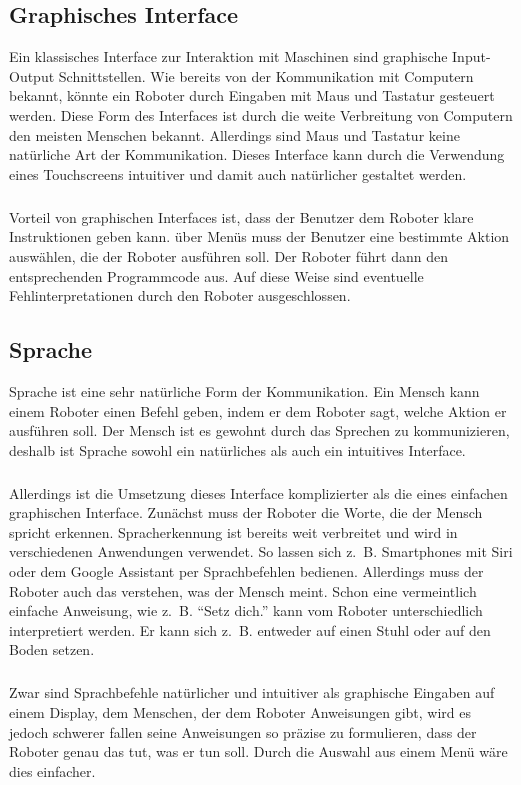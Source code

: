 \subsection{Graphisches Interface}
Ein klassisches Interface zur Interaktion mit Maschinen sind graphische
Input-Output Schnittstellen. Wie bereits von der Kommunikation mit Computern
bekannt, könnte ein Roboter durch Eingaben mit Maus und Tastatur gesteuert
werden. Diese Form des Interfaces ist durch die weite Verbreitung von Computern
den meisten Menschen bekannt. Allerdings sind Maus und Tastatur keine
natürliche Art der Kommunikation. Dieses Interface kann durch die Verwendung
eines Touchscreens intuitiver und damit auch natürlicher gestaltet werden.

\subparagraph{}
Vorteil von graphischen Interfaces ist, dass der Benutzer dem Roboter klare
Instruktionen geben kann. über Menüs muss der Benutzer eine bestimmte Aktion
auswählen, die der Roboter ausführen soll. Der Roboter führt dann den
entsprechenden Programmcode aus. Auf diese Weise sind eventuelle
Fehlinterpretationen durch den Roboter ausgeschlossen.

\subsection{Sprache}
Sprache ist eine sehr natürliche Form der Kommunikation. Ein Mensch kann einem
Roboter einen Befehl geben, indem er dem Roboter sagt, welche Aktion er
ausführen soll. Der Mensch ist es gewohnt durch das Sprechen zu kommunizieren,
deshalb ist Sprache sowohl ein natürliches als auch ein intuitives Interface.

\subparagraph{}
Allerdings ist die Umsetzung dieses Interface komplizierter als die eines
einfachen graphischen Interface. Zunächst muss der Roboter die Worte, die der
Mensch spricht erkennen. Spracherkennung ist bereits weit verbreitet und wird in
verschiedenen Anwendungen verwendet. So lassen sich z.~B. Smartphones mit Siri
oder dem Google Assistant per Sprachbefehlen bedienen. Allerdings muss der
Roboter auch das verstehen, was der Mensch meint. Schon eine vermeintlich
einfache Anweisung, wie z.~B. "`Setz dich."' kann vom Roboter unterschiedlich
interpretiert werden. Er kann sich z.~B. entweder auf einen Stuhl oder auf den
Boden setzen.

\subparagraph{}
Zwar sind Sprachbefehle natürlicher und intuitiver als graphische Eingaben auf
einem Display, dem Menschen, der dem Roboter Anweisungen gibt, wird es jedoch
schwerer fallen seine Anweisungen so präzise zu formulieren, dass der Roboter
genau das tut, was er tun soll. Durch die Auswahl aus einem Menü wäre dies
einfacher.

